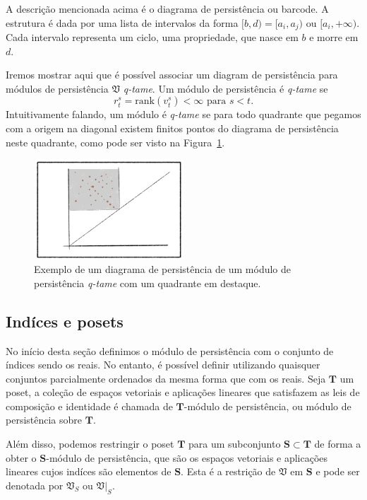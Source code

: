 A descrição mencionada acima é o diagrama de persistência ou barcode. A estrutura é dada por uma 
lista de intervalos da forma $[b,d) = [a_i, a_j)$ ou $[a_i, +\infty)$. Cada intervalo representa
um ciclo, uma propriedade, que nasce em $b$ e morre em $d$. 

Iremos mostrar aqui que é possível associar um diagram de persistência para módulos de 
persistência $\mathfrak{V}$ \textit{q-tame}. Um módulo de persistência é \textit{q-tame} 
se 
\begin{equation*}
    r_t^s = \text{rank}(v_t^s) < \infty \text{ para } s < t.
\end{equation*}
Intuitivamente falando, um módulo é \textit{q-tame} se para todo quadrante que pegamos com a origem
na diagonal existem finitos pontos do diagrama de persistência neste quadrante, como pode ser visto
na Figura~\ref{fig:quad_finito}.

\begin{figure}
    \centering
    \includegraphics[width=0.5\textwidth]{images/quad_finito.png}
    \caption{Exemplo de um diagrama de persistência de um módulo de 
            persistência \textit{q-tame} com um quadrante em destaque.}
    \label{fig:quad_finito}
    \fautor
\end{figure}

\subsection{Indíces e posets} 
No início desta seção definimos o módulo de persistência com o conjunto de índices sendo os reais. No 
entanto, é possível definir utilizando quaisquer conjuntos parcialmente ordenados da mesma forma que 
com os reais. Seja $\mathbf{T}$ um poset, a coleção de espaços vetoriais e aplicações lineares que 
satisfazem as leis de composição e identidade é chamada de $\mathbf{T}$-módulo de persistência, ou 
módulo de persistência sobre $\mathbf{T}$. 

Além disso, podemos restringir o poset $\mathbf{T}$ para um subconjunto $\mathbf{S} \subset \mathbf{T}$
de forma a obter o $\mathbf{S}$-módulo de persistência, que são os espaços vetoriais e aplicações lineares
cujos indíces são elementos de $\mathbf{S}$. Esta é a restrição de $\mathfrak{V}$ em $\mathbf{S}$ e pode
ser denotada por $\mathfrak{V}_S$ ou $\left.\mathfrak{V}\right|_S$. 

